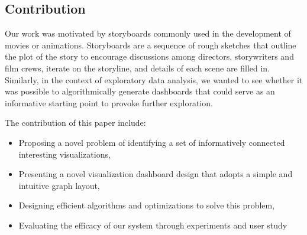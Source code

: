 \subsection{Contribution}
\par Our work was motivated by storyboards commonly used in the development of movies or animations. Storyboards are a sequence of rough sketches that outline the plot of the story to encourage discussions among directors, storywriters and film crews, iterate on the storyline, and details of each scene are filled in. Similarly, in the context of exploratory data analysis, we wanted to see whether it was possible to algorithmically generate dashboards that could serve as an informative starting point to provoke further exploration.
\par The contribution of this paper include: 
\begin{itemize}
\item Proposing a novel problem of identifying a set of informatively connected interesting visualizations,
\item Presenting a novel visualization dashboard design that adopts a simple and intuitive graph layout,
\item Designing efficient algorithms and optimizations to solve this problem,  
\item Evaluating the efficacy of our system through experiments and user study
\end{itemize}
